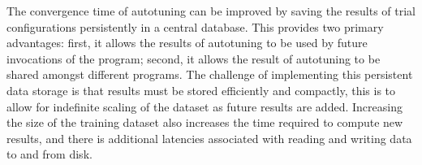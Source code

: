 The convergence time of autotuning can be improved by saving the
results of trial configurations persistently in a central
database. This provides two primary advantages: first, it allows the
results of autotuning to be used by future invocations of the program;
second, it allows the result of autotuning to be shared amongst
different programs. The challenge of implementing this persistent data
storage is that results must be stored efficiently and compactly, this
is to allow for indefinite scaling of the dataset as future results
are added. Increasing the size of the training dataset also increases
the time required to compute new results, and there is additional
latencies associated with reading and writing data to and from disk.

